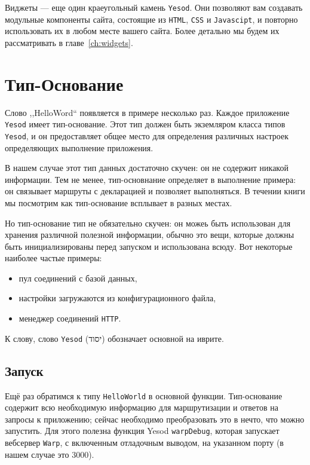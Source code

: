 Виджеты --- еще один краеугольный камень \texttt{Yesod}. Они позволяют вам создавать
модульные компоненты сайта, состоящие из \texttt{HTML}, \texttt{CSS} и \texttt{Javascipt},
и повторно использовать их в любом месте вашего сайта. Более детально мы будем их
рассматривать в главе~\ref{ch:widgets}.

\section{Тип-Основание}

Слово ,,HelloWord`` появляется в примере несколько раз. Каждое приложение 
\texttt{Yesod} имеет тип-основание. Этот тип должен быть экземляром класса 
типов \texttt{Yesod}, и он предоставляет общее место для определения 
различных настроек определяющих выполнение приложения.

В нашем случае этот тип данных достаточно скучен: он не содержит никакой 
информации. Тем не менее, тип-основнание определяет в выполнение примера: 
он связывает маршруты с декларацией и позволяет выполняться. 
В течении книги мы посмотрим как тип-основание всплывает в разных местах.

Но тип-основание тип не обязательно скучен: он можеь быть использован для 
хранения различной полезной информации, обычно это вещи,
которые должны быть инициализированы перед запуском и 
использована всюду. Вот некоторые наиболее частые примеры:

\begin{itemize}
  \item пул соединений с базой данных,
  \item настройки загружаются из конфигурационного файла,
  \item менеджер соединений \texttt{HTTP}.
\end{itemize}

К слову, слово \texttt{Yesod} (יסוד) обозначает основной на иврите.

\subsection{Запуск}

Ещё раз обратимся к типу \lstinline!HelloWorld! в основной функции.
Тип-основание содержит всю необходимую информацию для маршрутизации и 
ответов на запросы к приложению;
сейчас необходимо преобразовать это в нечто, что можно запустить. 
Для этого полезна функция Yesod \lstinline!warpDebug!, которая 
запускает вебсервер \texttt{Warp}, с включенным отладочным
выводом, на указанном порту (в нашем случае это $3000$).

